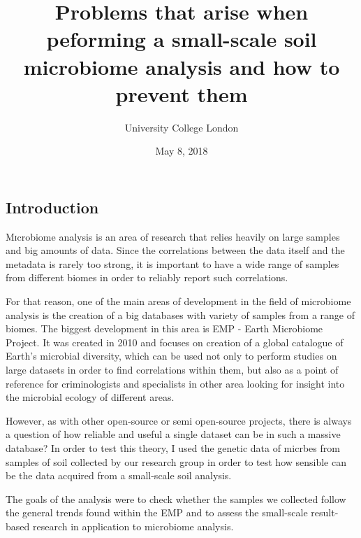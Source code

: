 \documentclass{article}
\title{Problems that arise when peforming a small-scale soil microbiome analysis and how to prevent them}
\author{
\normalsize University College London \\
}
\date{May 8, 2018}
\begin{document}
\maketitle
\begin{multicols}{2}
\section{Introduction}
\lettrine[nindent=0em,lines=3]{M}icrobiome analysis is an area of research that relies heavily on large samples and big amounts of data. Since the correlations between the data itself and the metadata is rarely too strong, it is important to have a wide range of samples from different biomes in order to reliably report such correlations.
\par 
For that reason, one of the main areas of development in the field of microbiome analysis is the creation of a big databases with variety of samples from a range of biomes. The biggest development in this area is  EMP - Earth Microbiome Project\cite{Gilbert2014}. It was created in 2010 and focuses on creation of a global catalogue of Earth's microbial diversity, which can be used not only to perform studies on large datasets in order to find correlations within them, but also as a point of reference for criminologists and specialists in other area looking for insight into the microbial ecology of different areas.
\par
However, as with other open-source or semi open-source projects, there is always a question of how reliable and useful a single dataset can be in such a massive database? In order to test this theory, I used the genetic data of micrbes from samples of soil collected by our research group in order to test how sensible can be the data acquired from a small-scale soil analysis.
\par
The goals of the analysis were to check whether the samples we collected follow the general trends found within the EMP and to assess the small-scale result-based research in application to microbiome analysis.

\end{multicols}
\end{document}
